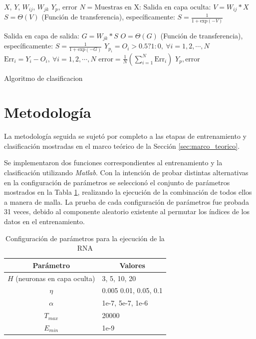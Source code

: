 \documentclass[journal]{IEEEtran}
\begin{document}
\begin{algorithm} 
\footnotesize
\begin{algorithmic}[1] 
\REQUIRE  $X$, $Y$, $W_{ij}$, $W_{jk}$
\ENSURE $Y_p$, $\text{error}$
\STATE $N=\text{Muestras en X}$:
\STATE Salida en capa oculta:
\STATE $V = W_{ij} * X$
\STATE $S = \Theta (V)$ (Función de transferencia), específicamente: $S = \frac{1}{1 + \text{exp}(-V)}$

\STATE Salida en capa de salida:
\STATE $G = W_{jk} * S$
\STATE $O = \Theta (G)$ (Función de transferencia), específicamente: $S = \frac{1}{1 + \text{exp}(-G)}$
\STATE $Y_{p_i} = O_i > 0.5? 1 : 0, ~\forall i = 1,2,\cdots,N$
\STATE $\text{Err}_i = Y_i - O_i, ~\forall i = 1,2,\cdots,N$
\STATE $\text{error} = \frac{1}{N}(\sum_{i=1}^{N}\text{Err}_i)$
\RETURN $Y_p,\text{error}$
\end{algorithmic} 
\caption{Algoritmo de clasificacion} 
\label{alg:algoritmo-clasificacion}
\end{algorithm}

\section{Metodología}
\label{sec:metodologia}
La metodología seguida se sujetó por completo a las etapas de entrenamiento y clasificación mostradas en el marco teórico de la Sección \ref{sec:marco_teorico}.

Se implementaron dos funciones correspondientes al entrenamiento y la clasificación utilizando \emph{Matlab}.
Con la intención de probar distintas alternativas en la configuración de parámetros se  seleccionó el conjunto de parámetros mostrados en la Tabla \ref{tbl:parametros}, realizando la ejecución de la combinación de todos ellos a manera de malla.
La prueba de cada configuración de parámetros fue probada 31 veces, debido al componente aleatorio existente al permutar los índices de los datos en el entrenamiento.

\begin{table}[h]
\centering
\begin{tabular}{@{}cl@{}}
\toprule
\textbf{Parámetro} & \multicolumn{1}{c}{\textbf{Valores}} \\ \midrule
$H$ (neuronas en capa oculta)                  & 3, 5, 10, 20                         \\
$\eta$                & 0.005 0.01, 0.05, 0.1                \\
$\alpha$             & 1e-7, 5e-7, 1e-6                     \\
$T_{max}$          & 20000                                \\
$E_{min}$          & 1e-9                                 \\ \bottomrule
\end{tabular}
\caption{Configuración de parámetros para la ejecución de la RNA}
\label{tbl:parametros}
\end{table}
\end{document}

